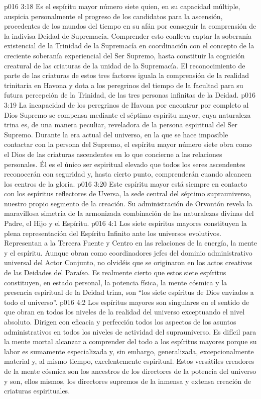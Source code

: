 \vs p016 3:18 Es el espíritu mayor número siete quien, en su capacidad múltiple, auspicia personalmente el progreso de los candidatos para la ascensión, procedentes de los mundos del tiempo en su afán por conseguir la comprensión de la indivisa Deidad de Supremacía. Comprender esto conlleva captar la soberanía existencial de la Trinidad de la Supremacía en coordinación con el concepto de la creciente soberanía experiencial del Ser Supremo, hasta constituir la cognición creatural de las criaturas de la unidad de la Supremacía. El reconocimiento de parte de las criaturas de estos tres factores iguala la comprensión de la realidad trinitaria en Havona y dota a los peregrinos del tiempo de la facultad para su futura percepción de la Trinidad, de las tres personas infinitas de la Deidad.
\vs p016 3:19 La incapacidad de los peregrinos de Havona por encontrar por completo al Dios Supremo se compensa mediante el séptimo espíritu mayor, cuya naturaleza trina es, de una manera peculiar, reveladora de la persona espiritual del Ser Supremo. Durante la era actual del universo, en la que se hace imposible contactar con la persona del Supremo, el espíritu mayor número siete obra como el Dios de las criaturas ascendentes en lo que concierne a las relaciones personales. Él es el único ser espiritual elevado que todos los seres ascendentes reconocerán con seguridad y, hasta cierto punto, comprenderán cuando alcancen los centros de la gloria.
\vs p016 3:20 Este espíritu mayor está siempre en contacto con los espíritus reflectores de Uversa, la sede central del séptimo suprauniverso, nuestro propio segmento de la creación. Su administración de Orvontón revela la maravillosa simetría de la armonizada combinación de las naturalezas divinas del Padre, el Hijo y el Espíritu.
\vs p016 4:1 Los siete espíritus mayores constituyen la plena representación del Espíritu Infinito ante los universos evolutivos. Representan a la Tercera Fuente y Centro en las relaciones de la energía, la mente y el espíritu. Aunque obran como coordinadores jefes del dominio administrativo universal del Actor Conjunto, no olvidéis que se originaron en los actos creativos de las Deidades del Paraíso. Es realmente cierto que estos siete espíritus constituyen, en estado personal, la potencia física, la mente cósmica y la presencia espiritual de la Deidad trina, son “los siete espíritus de Dios enviados a todo el universo”.
\vs p016 4:2 Los espíritus mayores son singulares en el sentido de que obran en todos los niveles de la realidad del universo exceptuando el nivel absoluto. Dirigen con eficacia y perfección todos los aspectos de los asuntos administrativos en todos los niveles de actividad del suprauniverso. Es difícil para la mente mortal alcanzar a comprender del todo a los espíritus mayores porque su labor es sumamente especializada y, sin embargo, generalizada, excepcionalmente material y, al mismo tiempo, excelentemente espiritual. Estos versátiles creadores de la mente cósmica son los ancestros de los directores de la potencia del universo y son, ellos mismos, los directores supremos de la inmensa y extensa creación de criaturas espirituales.
